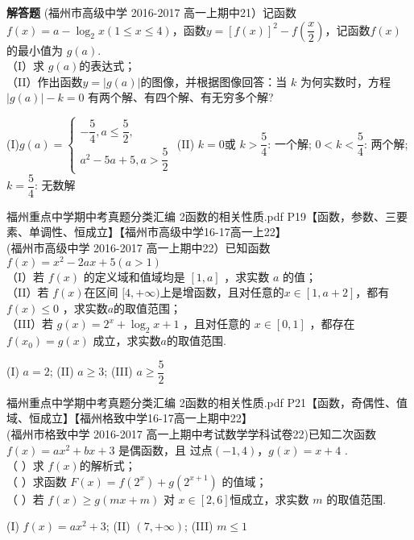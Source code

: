 \begin{exercise}{\bf 解答题}
     (福州市高级中学 2016-2017 高一上期中21）记函数 $f (x )=a-\log_2{x}(1\leq x\leq 4)$，函数$y=[f(x)]^2-f(\dfrac x2)$，记函数$f(x)$ 的最小值为 $g( a)$.\\
     （I）求 $g( a) $的表达式；\\
     （II）作出函数$y=|g(a)|$的图像，并根据图像回答：当 $k$ 为何实数时，方程$|g( a)|-k=0$ 有两个解、有四个解、有无穷多个解?
     \begin{answer}
      (I)$g(a)=\begin{cases}-\dfrac54,a\leq\dfrac52,\\a^2-5a+5,a>\dfrac52\end{cases} $
      (II) $k=0$或 $k>\dfrac54 $: 一个解;  $0<k<\dfrac54$: 两个解;   $k=\dfrac54$: 无数解
     \end{answer}
    \item 福州重点中学期中考真题分类汇编 2函数的相关性质.pdf P19【函数，参数、三要素、单调性、恒成立】【福州市高级中学16-17高一上22】\\
     (福州市高级中学 2016-2017 高一上期中22）已知函数$f(x)=x^2-2ax+5(a>1)$\\
     （I）若 $f (x )$ 的定义域和值域均是 $[1, a]$ ，求实数 $a$ 的值； \\
     （II）若 $f (x ) $在区间 $[4,+\infty)$上是增函数，且对任意的$ x \in[1, a+ 2]$，都有 $f( x )\leq 0$ ，求实数$a$的取值范围；\\
     （III）若 $g( x )=2^x+\log_2{x+ 1 }$ ，且对任意的 $x \in[0,1]$ ，都存在$f(x_0)=g(x)$ 成立，求实数$a$的取值范围.
     \begin{answer}
      (I) $a=2$;
      (II) $a\geq3$;
      (III) $a\geq\dfrac52$
     \end{answer}
    \item 福州重点中学期中考真题分类汇编 2函数的相关性质.pdf P21【函数，奇偶性、值域、恒成立】【福州格致中学16-17高一上期中22】\\
     (福州市格致中学 2016-2017 高一上期中考试数学学科试卷22)已知二次函数 $f ( x )= ax^2+ bx+3$ 是偶函数，且 过点$(-1,4)$，$ g ( x )= x + 4$ .\\
     （ ）求 $f (x) $的解析式；\\
     （ ）求函数 $F ( x )= f (2^x )+ g (2^{x+1} )$ 的值域； \\
     （ ）若 $f ( x ) \geq g ( mx +m )$ 对 $x\in [2, 6] $恒成立，求实数 $m$ 的取值范围.
     \begin{answer}
      (I) $f(x)=ax^2+3$;
      (II) $(7,+\infty)$;
      (III) $m\leq1$
     \end{answer}

\end{exercise}
